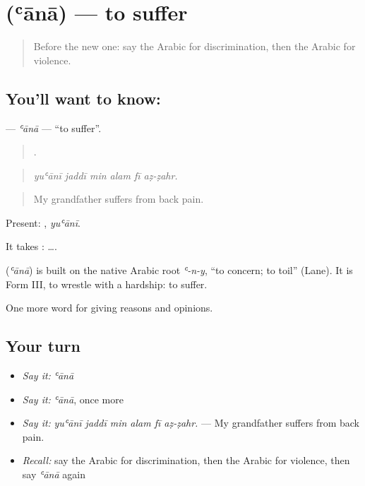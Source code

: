 \section[\texorpdfstring{\ar{عانى} (ʿānā)}{عانى (ʿānā)}]{ (ʿānā) — to suffer}

\label{lesson:AR-C381-ana}



\begin{quote}
Before the new one: say the Arabic for discrimination, then the Arabic for violence.
\end{quote}

\subsection*{You'll want to know: }
\textbf{} — \emph{ʿānā} — \textquotedblleft{}to suffer\textquotedblright{}.

\begin{quote}
     .
\end{quote}

\begin{quote}
\emph{yuʿānī jaddī min alam fī aẓ-ẓahr.}
\end{quote}

\begin{quote}
My grandfather suffers from back pain.
\end{quote}

Present: , \emph{yuʿānī}.

It takes :   ….

\begin{cousinweb}
\textbf{} (\emph{ʿānā}) is built on the native Arabic root \emph{ʿ-n-y}, \textquotedblleft{}to concern; to toil\textquotedblright{} (Lane). It is Form III, to wrestle with a hardship: to suffer.
\end{cousinweb}

\begin{grammarlens}[title={What you've built}]
One more word for giving reasons and opinions.
\end{grammarlens}

\subsection*{Your turn}
\begin{itemize}
\raggedright
  \item \emph{Say it:} \emph{ʿānā}
  \item \emph{Say it:} \emph{ʿānā}, once more
  \item \emph{Say it:} \emph{yuʿānī jaddī min alam fī aẓ-ẓahr.} — My grandfather suffers from back pain.
  \item \emph{Recall:} say the Arabic for discrimination, then the Arabic for violence, then say \emph{ʿānā} again
\end{itemize}

